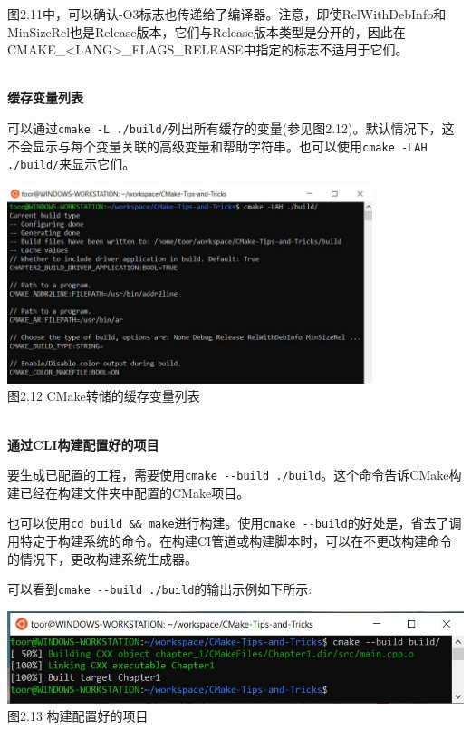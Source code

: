图2.11中，可以确认-O3标志也传递给了编译器。注意，即使RelWithDebInfo和MinSizeRel也是Release版本，它们与Release版本类型是分开的，因此在CMAKE\_<LANG>\_FLAGS\_RELEASE中指定的标志不适用于它们。

\hspace*{\fill} \\ %
\noindent
\textbf{缓存变量列表}

可以通过\texttt{cmake -L ./build/}列出所有缓存的变量(参见图2.12)。默认情况下，这不会显示与每个变量关联的高级变量和帮助字符串。也可以使用\texttt{cmake -LAH ./build/}来显示它们。

\begin{center}
\includegraphics[width=0.8\textwidth]{content/1/chapter2/images/12.jpg}\\
图2.12 CMake转储的缓存变量列表
\end{center}

\hspace*{\fill} \\ %
\noindent
\textbf{通过CLI构建配置好的项目}

要生成已配置的工程，需要使用\texttt{cmake -{}-build ./build}。这个命令告诉CMake构建已经在构建文件夹中配置的CMake项目。

也可以使用\texttt{cd build \&\& make}进行构建。使用\texttt{cmake -{}-build}的好处是，省去了调用特定于构建系统的命令。在构建CI管道或构建脚本时，可以在不更改构建命令的情况下，更改构建系统生成器。

可以看到\texttt{cmake -{}-build ./build}的输出示例如下所示:

\begin{center}
\includegraphics[width=1.\textwidth]{content/1/chapter2/images/13.jpg}\\
图2.13 构建配置好的项目
\end{center}

